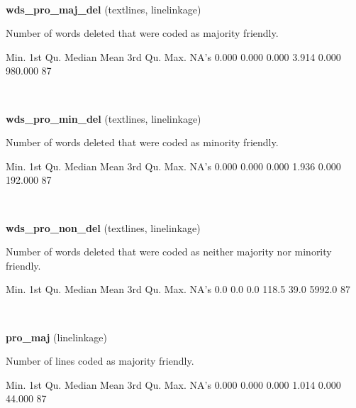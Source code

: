 \documentclass[]{article}
\newenvironment{Shaded}{\begin{snugshade}}{\end{snugshade}}
\newcommand{\StringTok}[1]{\textcolor[rgb]{0.31,0.60,0.02}{{#1}}}
\newcommand{\NormalTok}[1]{{#1}}
\begin{document}
~

\vspace{1em}

\textbf{wds\_pro\_maj\_del} (textlines, linelinkage)

Number of words deleted that were coded as majority friendly.

\begin{Shaded}
\begin{Highlighting}[]
   \NormalTok{Min. 1st Qu.  Median    Mean 3rd Qu.    Max.    NA}\StringTok{'s }
\StringTok{  0.000   0.000   0.000   3.914   0.000 980.000      87 }
\end{Highlighting}
\end{Shaded}

~

\vspace{1em}

\textbf{wds\_pro\_min\_del} (textlines, linelinkage)

Number of words deleted that were coded as minority friendly.

\begin{Shaded}
\begin{Highlighting}[]
   \NormalTok{Min. 1st Qu.  Median    Mean 3rd Qu.    Max.    NA}\StringTok{'s }
\StringTok{  0.000   0.000   0.000   1.936   0.000 192.000      87 }
\end{Highlighting}
\end{Shaded}

~

\vspace{1em}

\textbf{wds\_pro\_non\_del} (textlines, linelinkage)

Number of words deleted that were coded as neither majority nor minority
friendly.

\begin{Shaded}
\begin{Highlighting}[]
   \NormalTok{Min. 1st Qu.  Median    Mean 3rd Qu.    Max.    NA}\StringTok{'s }
\StringTok{    0.0     0.0     0.0   118.5    39.0  5992.0      87 }
\end{Highlighting}
\end{Shaded}

~

\vspace{1em}

\textbf{pro\_maj} (linelinkage)

Number of lines coded as majority friendly.

\begin{Shaded}
\begin{Highlighting}[]
   \NormalTok{Min. 1st Qu.  Median    Mean 3rd Qu.    Max.    NA}\StringTok{'s }
\StringTok{  0.000   0.000   0.000   1.014   0.000  44.000      87 }
\end{Highlighting}
\end{Shaded}
\end{document}
